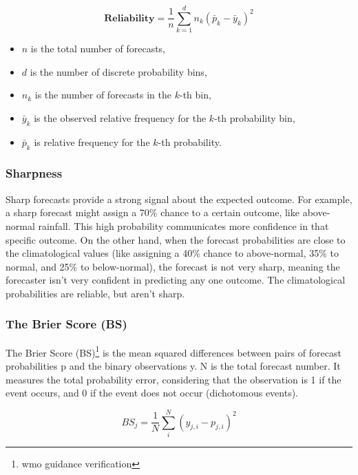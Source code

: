 \begin{equation}
\textbf{Reliability} = \frac{1}{n} \sum_{k=1}^{d} n_k \left( \bar{p}_k - \bar{y}_k \right)^2
\end{equation}


\begin{itemize}
    \item $n$ is the total number of forecasts,
    \item $d$ is the number of discrete probability bins,
    \item $n_k$ is the number of forecasts in the $k$-th bin,
    \item $\bar{y}_k$ is the observed relative frequency for the $k$-th probability bin,
    \item $\bar{p}_k$ is relative frequency for the $k$-th probability.
\end{itemize}


		\subsubsection{Sharpness}
Sharp forecasts provide a strong signal about the expected outcome. For example, a sharp forecast might assign a 70\% chance to a certain outcome, like above-normal rainfall. This high probability communicates more confidence in that specific outcome.
On the other hand, when the forecast probabilities are close to the climatological values (like assigning a 40\% chance to above-normal, 35\% to normal, and 25\% to below-normal), the forecast is not very sharp, meaning the forecaster isn't very confident in predicting any one outcome.
The climatological probabilities are reliable, but aren’t sharp.




\subsubsection{The Brier Score (BS)}
The Brier Score (BS)\footnote{wmo guidance verification} is the mean squared differences between pairs of forecast probabilities p and the binary observations y. N is the total forecast number. It measures the total probability error, considering that the observation is 1 if the event occurs, and 0 if the event does not occur (dichotomous events).

$$BS_j=\frac{1}{N} \sum\limits_{i}^{N} (y_{j,i} - p_{j,i})^2$$

